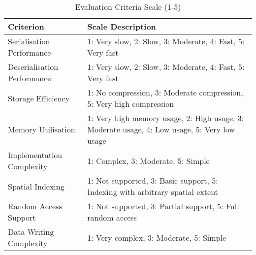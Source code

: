 \begin{table}[htbp]
  \caption{Evaluation Criteria Scale (1-5)}
  \label{tab:criteria-scale}
  \begin{tabular}{p{3cm}|p{12cm}}
    \hline
    \textbf{Criterion} & \textbf{Scale Description} \\
    \hline
    Serialisation Performance & 1: Very slow, 2: Slow, 3: Moderate, 4: Fast, 5: Very fast \\
    \hline
    Deserialisation Performance & 1: Very slow, 2: Slow, 3: Moderate, 4: Fast, 5: Very fast \\
    \hline
    Storage Efficiency & 1: No compression, 3: Moderate compression, 5: Very high compression \\
    \hline
    Memory Utilisation & 1: Very high memory usage, 2: High usage, 3: Moderate usage, 4: Low usage, 5: Very low usage \\
    \hline
    Implementation Complexity & 1: Complex, 3: Moderate, 5: Simple \\
    \hline
    Spatial Indexing & 1: Not supported, 3: Basic support, 5: Indexing with arbitrary spatial extent \\
    \hline
    Random Access Support & 1: Not supported, 3: Partial support, 5: Full random access \\
    \hline
    Data Writing Complexity & 1: Very complex, 3: Moderate, 5: Simple \\
    \hline
  \end{tabular}
\end{table}